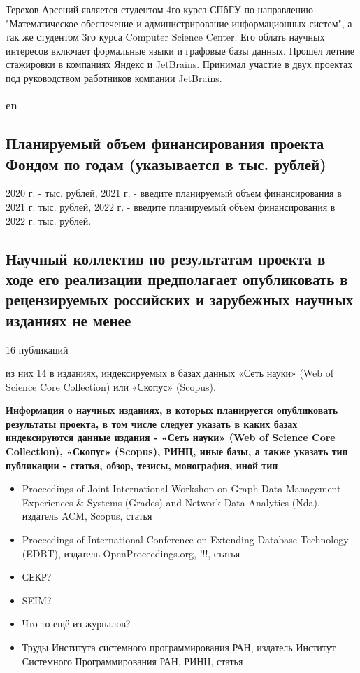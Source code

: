 \documentclass[12pt]{article}  %
\theoremstyle{remark}
\begin{document}
Терехов Арсений является студентом 4го курса СПбГУ по направлению "Математическое обеспечение и администрирование информационных
систем", а так же студентом 3го курса Computer Science Center. Его облать научных интересов включает формальные языки и графовые базы данных.
Прошёл летние стажировки в компаниях Яндекс и JetBrains. Принимал участие в двух проектах под руководством работников
компании JetBrains.
\\
\\
\textbf{en}


\subsection{Планируемый объем финансирования проекта Фондом по годам (указывается в тыс. рублей)}
2020 г. - тыс. рублей,
2021 г. - введите планируемый объем финансирования в 2021 г. тыс. рублей,
2022 г. - введите планируемый объем финансирования в 2022 г. тыс. рублей.

\subsection{Научный коллектив по результатам проекта в ходе его реализации предполагает опубликовать в рецензируемых российских и зарубежных научных изданиях не менее}

16 публикаций

из них 14 в изданиях, индексируемых в базах данных «Сеть науки» (Web of Science Core Collection) или «Скопус» (Scopus).

\textbf{Информация о научных изданиях, в которых планируется опубликовать результаты проекта, в том числе следует указать в каких базах индексируются данные издания - «Сеть науки» (Web of Science Core Collection), «Скопус» (Scopus), РИНЦ, иные базы, а также указать тип публикации - статья, обзор, тезисы, монография, иной тип}
\begin{itemize}
  \item Proceedings of Joint International Workshop on Graph Data Management Experiences \& Systems (Grades) and Network Data Analytics (Nda), издатель  ACM, Scopus, статья
  \item Proceedings of International Conference on Extending Database Technology (EDBT), издатель OpenProceedings.org, !!!, статья
  \item СЕКР?
  \item SEIM?
  \item Что-то ещё из журналов?
  \item Труды Института системного программирования РАН, издатель Институт Системного Программирования РАН, РИНЦ, статья
\end{itemize}
\end{document}
